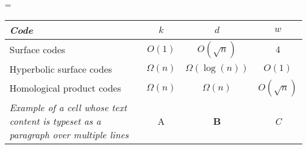 \documentclass[10pt]{article}
\begin{document}
%
\textwidth=500pt\relax
\hsize=\textwidth\relax
\parindent=0pt\relax
\renewcommand{\arraystretch}{1.2}
%
\begin{preview}%
%
%
%
%
\begin{tabular}{lccc}
\toprule
\emph{Code} &
$k$ & $d$ & $w$
\\
\midrule
Surface codes &
$O(1)$  & $O(\sqrt{n})$  & $4$
\\ 
Hyperbolic surface codes &
$\Omega(n)$ & $\Omega(\log(n))$ & $O(1)$
\\
\rowcolor{green!25!white}
Homological product codes
& $\Omega(n)$ & $\Omega(n)$ & $O(\sqrt{n})$
\\
\multicolumn{1}{m{4.5cm}}{%
\cellcolor{red!25!white}%
\raggedright\itshape
Example of a cell whose text content is typeset 
as a paragraph over multiple lines
}
& A & \textbf{B} & \emph{C}
\\
\bottomrule
\end{tabular}%
%
%
%
%
\end{preview}%
\end{document}
